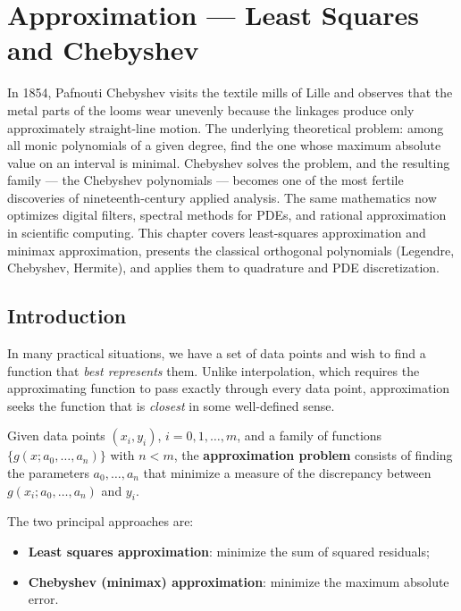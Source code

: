 
\chapter{Approximation --- Least Squares and Chebyshev}
\label{ch:approximation}


In 1854, Pafnouti Chebyshev visits the textile mills of Lille and observes that the metal parts of the looms wear unevenly because the linkages produce only approximately straight-line motion. The underlying theoretical problem: among all monic polynomials of a given degree, find the one whose maximum absolute value on an interval is minimal. Chebyshev solves the problem, and the resulting family --- the Chebyshev polynomials --- becomes one of the most fertile discoveries of nineteenth-century applied analysis. The same mathematics now optimizes digital filters, spectral methods for PDEs, and rational approximation in scientific computing. This chapter covers least-squares approximation and minimax approximation, presents the classical orthogonal polynomials (Legendre, Chebyshev, Hermite), and applies them to quadrature and PDE discretization.

\section{Introduction}

In many practical situations, we have a set of data points and wish to find a function that \emph{best represents} them. Unlike interpolation, which requires the approximating function to pass exactly through every data point, approximation seeks the function that is \emph{closest} in some well-defined sense.

\begin{definition}
\label{def:approximation}
Given data points $(x_i, y_i)$, $i = 0, 1, \ldots, m$, and a family of functions $\{g(x; a_0, \ldots, a_n)\}$ with $n < m$, the \textbf{approximation problem} consists of finding the parameters $a_0, \ldots, a_n$ that minimize a measure of the discrepancy between $g(x_i; a_0, \ldots, a_n)$ and $y_i$.
\end{definition}

The two principal approaches are:
\begin{itemize}
    \item \textbf{Least squares approximation}: minimize the sum of squared residuals;
    \item \textbf{Chebyshev (minimax) approximation}: minimize the maximum absolute error.
\end{itemize}

